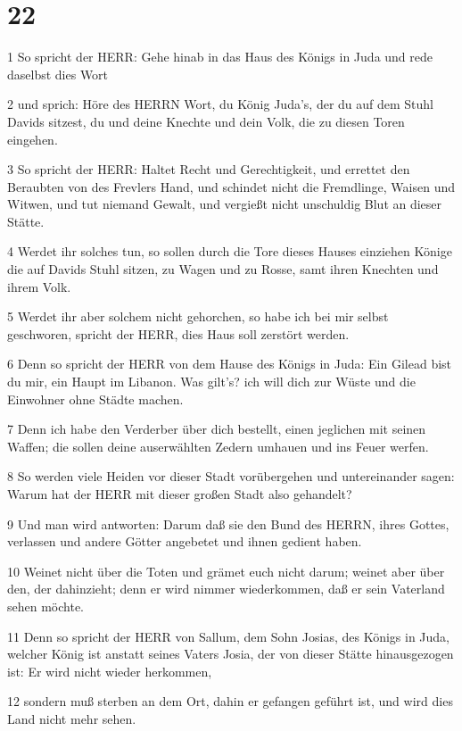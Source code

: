 \chapter{22}

\par 1 So spricht der HERR: Gehe hinab in das Haus des Königs in Juda und rede daselbst dies Wort
\par 2 und sprich: Höre des HERRN Wort, du König Juda's, der du auf dem Stuhl Davids sitzest, du und deine Knechte und dein Volk, die zu diesen Toren eingehen.
\par 3 So spricht der HERR: Haltet Recht und Gerechtigkeit, und errettet den Beraubten von des Frevlers Hand, und schindet nicht die Fremdlinge, Waisen und Witwen, und tut niemand Gewalt, und vergießt nicht unschuldig Blut an dieser Stätte.
\par 4 Werdet ihr solches tun, so sollen durch die Tore dieses Hauses einziehen Könige die auf Davids Stuhl sitzen, zu Wagen und zu Rosse, samt ihren Knechten und ihrem Volk.
\par 5 Werdet ihr aber solchem nicht gehorchen, so habe ich bei mir selbst geschworen, spricht der HERR, dies Haus soll zerstört werden.
\par 6 Denn so spricht der HERR von dem Hause des Königs in Juda: Ein Gilead bist du mir, ein Haupt im Libanon. Was gilt's? ich will dich zur Wüste und die Einwohner ohne Städte machen.
\par 7 Denn ich habe den Verderber über dich bestellt, einen jeglichen mit seinen Waffen; die sollen deine auserwählten Zedern umhauen und ins Feuer werfen.
\par 8 So werden viele Heiden vor dieser Stadt vorübergehen und untereinander sagen: Warum hat der HERR mit dieser großen Stadt also gehandelt?
\par 9 Und man wird antworten: Darum daß sie den Bund des HERRN, ihres Gottes, verlassen und andere Götter angebetet und ihnen gedient haben.
\par 10 Weinet nicht über die Toten und grämet euch nicht darum; weinet aber über den, der dahinzieht; denn er wird nimmer wiederkommen, daß er sein Vaterland sehen möchte.
\par 11 Denn so spricht der HERR von Sallum, dem Sohn Josias, des Königs in Juda, welcher König ist anstatt seines Vaters Josia, der von dieser Stätte hinausgezogen ist: Er wird nicht wieder herkommen,
\par 12 sondern muß sterben an dem Ort, dahin er gefangen geführt ist, und wird dies Land nicht mehr sehen.
